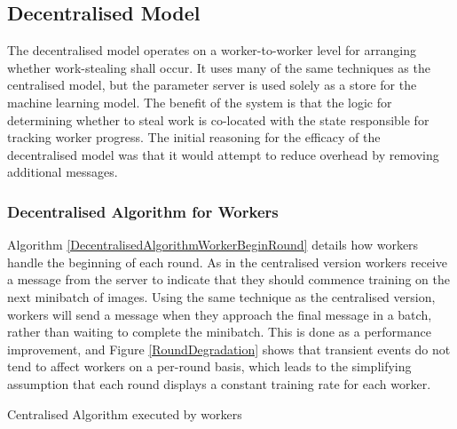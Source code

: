 \documentclass[12pt]{article}
\begin{document}
\subsection{Decentralised Model}
The decentralised model operates on a worker-to-worker level for arranging whether work-stealing shall occur. It uses many of the same techniques as the centralised model, but the parameter server is used solely as a store for the machine learning model.
\newline
\newline
The benefit of the system is that the logic for determining whether to steal work is co-located with the state responsible for tracking worker progress. The initial reasoning for the efficacy of the decentralised model was that it would attempt to reduce overhead by removing additional messages.

\subsubsection{Decentralised Algorithm for Workers}

Algorithm \ref{DecentralisedAlgorithmWorkerBeginRound} details how workers handle the beginning of each round. As in the centralised version workers receive a  message from the server to indicate that they should commence training on the next minibatch of images.
\newline
\newline
Using the same technique as the centralised version, workers will send a message when they approach the final message in a batch, rather than waiting to complete the minibatch. This is done as a performance improvement, and Figure \ref{RoundDegradation} shows that transient events do not tend to affect workers on a per-round basis, which leads to the simplifying assumption that each round displays a constant training rate for each worker.

\IncMargin{1em}
\begin{algorithm}[H]
 \BlankLine
 \caption{Centralised Algorithm executed by workers}
 \label{DecentralisedAlgorithmWorkerBeginRound}
\end{algorithm}
\DecMargin{1em}
\medskip
\end{document}
